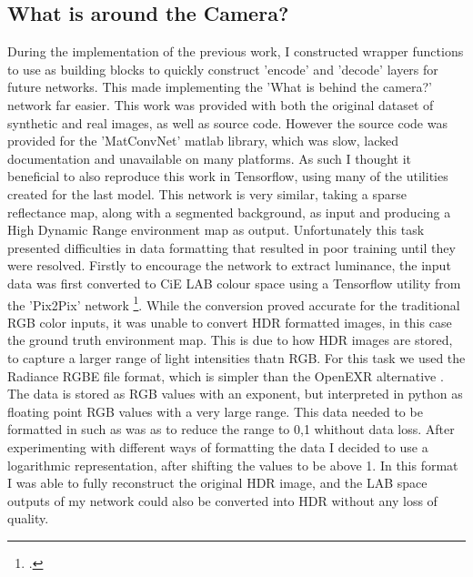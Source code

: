 \documentclass[ %
                    author={Gavin Parker},
                supervisor={Dr. Neill Campbell},
                    degree={MEng},
                     title={Deep Siamese Networks for Illumination Estimation from Stereo Images},
                  subtitle={},
                      type={research},
                      year={2018} ]{dissertation}
\begin{document}
\subsection{What is around the Camera?}
During the implementation of the previous work, I constructed wrapper functions to use as building blocks to quickly construct 'encode' and 'decode' layers for future networks. This made implementing the 'What is behind the camera?' network far easier. This work was provided with both the original dataset of synthetic and real images, as well as source code. However the source code was provided for the 'MatConvNet' matlab library, which was slow, lacked documentation and unavailable on many platforms. As such I thought it beneficial to also reproduce this work in Tensorflow, using many of the utilities created for the last model. This network is very similar, taking a sparse reflectance map, along with a segmented background, as input and producing a High Dynamic Range environment map as output.
\newline
Unfortunately this task presented difficulties in data formatting that resulted in poor training until they were resolved. Firstly to encourage the network to extract luminance, the input data was first converted to CiE LAB colour space using a Tensorflow utility from the 'Pix2Pix' network \footcite{https://github.com/affinelayer/pix2pix-tensorflow/blob/master/pix2pix.py}. While the conversion proved accurate for the traditional RGB color inputs, it was unable to convert HDR formatted images, in this case the ground truth environment map. This is due to how HDR images are stored, to capture a larger range of light intensities thatn RGB. For this task we used the Radiance RGBE file format, which is simpler than the OpenEXR alternative . The data is stored as RGB values with an exponent, but interpreted in python as floating point RGB values with a very large range. This data needed to be formatted in such as was as to reduce the range to 0,1 whithout data loss. After experimenting with different ways of formatting the data I decided to use a logarithmic representation, after shifting the values to be above 1. In this format I was able to fully reconstruct the original HDR image, and the LAB space outputs of my network could also be converted into HDR without any loss of quality.
\newline
\end{document}
